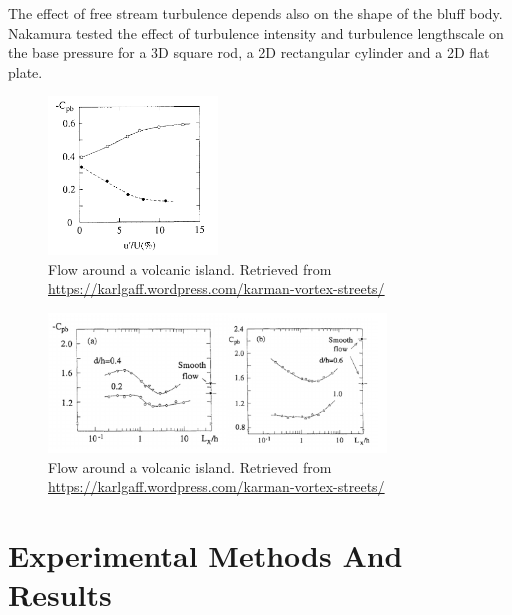 \documentclass[journal]{new-aiaa}
\begin{document}
The effect of free stream turbulence depends also on the shape of the bluff body. Nakamura \cite{nakamura1993bluffbody} tested the effect of turbulence intensity and turbulence lengthscale on the base pressure for a 3D square rod, a 2D rectangular cylinder and a 2D flat plate.  

\begin{figure}[H]
\begin{center}
\includegraphics[width=0.4\textwidth]{Images/federico/Figure09}
\caption{Flow around a volcanic island. Retrieved from  \url{https://karlgaff.wordpress.com/karman-vortex-streets/}}
\label{fig:T}
\end{center}
\end{figure}


\begin{figure}[H]
\begin{center}
\includegraphics[width=0.8\textwidth]{Images/federico/Figure08}
\caption{Flow around a volcanic island. Retrieved from  \url{https://karlgaff.wordpress.com/karman-vortex-streets/}}
\label{fig:T}
\end{center}
\end{figure}



\section{Experimental Methods And Results} \label{sec:experimentalmethods}
\end{document}
